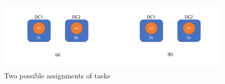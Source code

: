 \begin{figure}[htb]
\includegraphics[width=1\textwidth]{figure/fig-greedy_eg.pdf}
\centering
\caption{Two possible assignments of tasks} \label{greedy_eg}
\end{figure}